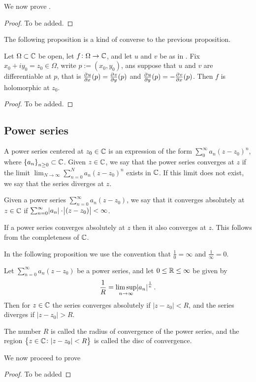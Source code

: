 \documentclass[11pt,a4paper]{article}
\newcommand{\powerseries}{\sum_{n=0}^{\infty} a_n (z - z_0)}
\begin{document}
We now prove .

\begin{proof}
  To be added.
\end{proof}

The following proposition is a kind of converse to the previous proposition.

\begin{proposition}
  Let $\Omega \subset \mathbb{C}$ be open, let $f \colon \Omega \to \mathbb{C}$,
  and let $u$ and $v$ be as in .
  Fix $x_0 + i y_0 = z_0 \in \Omega$, write $p := (x_0,y_0)$,
  ans suppose that $u$ and $v$ are differentiable at $p$,
  that is $\pd{u}{x}(p) = \pd{v}{y}(p)$ and $\pd{u}{y}(p) = - \pd{v}{x}(p)$.
  Then $f$ is holomorphic at $z_0$.
\end{proposition}
\begin{proof}
  To be added.
\end{proof}

\subsection{Power series}

\begin{definition}
  A power series centered at $z_0 \in \mathbb{C}$ is an expression of the
  form $\sum_{0}^{\infty} a_n (z - z_0)^n$,
  where $\set{a_n}_{n \geq 0} \subset \mathbb{C}$.
  Given $z \in \mathbb{C}$, we say that the power series converges at $z$ if
  the limit $\lim_{N \to \infty} \sum_{n=0}^{N} a_n (z - z_0)^n$ exists
  in $\mathbb{C}$.
  If this limit does not exist, we say that the series diverges at $z$.
\end{definition}

\begin{definition}
  Given a power series $\sum_{n=0}^{\infty} a_n (z - z_0)$,
  we say that it converges absolutely at $z \in \mathbb{C}$ if
  $\sum_{n=0}^{\infty} \abs{a_n} \cdot \abs{(z - z_0)} < \infty$.
\end{definition}

\begin{proposition}
  If a power series converges absolutely at $z$ then it also converges at $z$.
  This follows from the completeness of $\mathbb{C}$.
\end{proposition}

In the following proposition we use the convention that $\frac{1}{0} = \infty$
and $\frac{1}{\infty} = 0$.

\begin{proposition}
  \label{thm:hadamard}
  Let $\powerseries$ be a power series, and let $0 \le \mathbb{R} \le \infty$
  be given by
  \[
    \frac{1}{R} = \limsup_{n \to \infty} \abs{a_n}^{\frac 1n}.
  \]
  Then for $z \in \mathbb{C}$ the series converges absolutely if $|z - z_0| < R$,
  and the series diverges if $|z - z_0| > R$.
\end{proposition}

\begin{remark}
  The number $R$ is called the radius of convergence of the power series,
  and the region $\set{z \in \mathbb{C}\colon |z - z_0| < R}$ is called the disc
  of convergence.
\end{remark}

We now proceed to prove 

\begin{proof}
  To be added
\end{proof}
\end{document}
